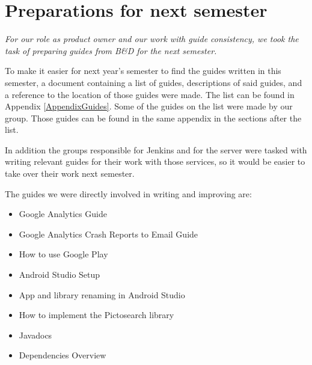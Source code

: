 \section{Preparations for next semester}
\textit{For our role as product owner and our work with guide consistency, we took the task of preparing guides from B\&D for the next semester.}

To make it easier for next year’s semester to find the guides written in this semester, a document containing a list of guides, descriptions of said guides, and a reference to the location of those guides were made. The list can be found in Appendix \ref{AppendixGuides}.
Some of the guides on the list were made by our group. Those guides can be found in the same appendix in the sections after the list.

In addition the groups responsible for Jenkins and for the server were tasked with writing relevant guides for their work with those services, so it would be easier to take over their work next semester.

The guides we were directly involved in writing and improving are:
\begin{itemize}
	\item Google Analytics Guide
	\item Google Analytics Crash Reports to Email Guide 
	\item How to use Google Play
	\item Android Studio Setup
	\item App and library renaming in Android Studio
	\item How to implement the Pictosearch library
	\item Javadocs
	\item Dependencies Overview
\end{itemize}